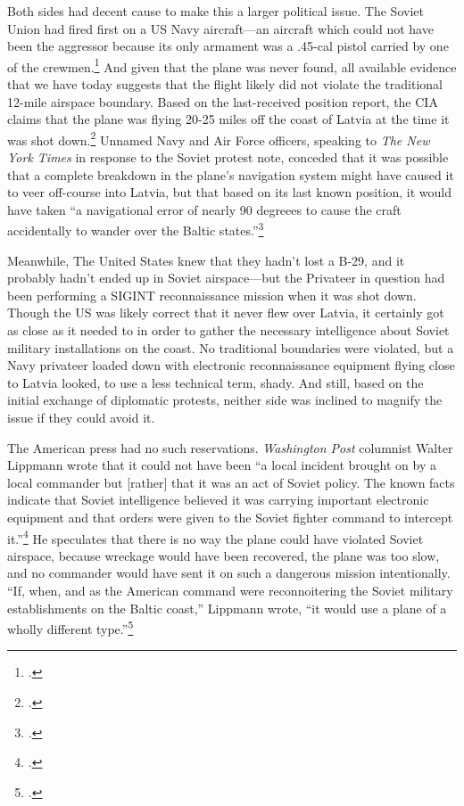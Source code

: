 \documentclass[12pt]{article}
\begin{document}
Both sides had decent cause to make this a larger political issue. The Soviet Union had fired first on a US Navy aircraft---an aircraft which could not have been the aggressor because its only armament was a .45-cal pistol carried by one of the crewmen.\footcite[p.~7]{peterson_maybe_1993} And given that the plane was never found, all available evidence that we have today suggests that the flight likely did not violate the traditional 12-mile airspace boundary. Based on the last-received position report, the CIA claims that the plane was flying 20-25 miles off the coast of Latvia at the time it was shot down.\footcite[p.~7]{peterson_maybe_1993} Unnamed Navy and Air Force officers, speaking to \emph{The New York Times} in response to the Soviet protest note, conceded that it was possible that a complete breakdown in the plane's navigation system might have caused it to veer off-course into Latvia, but that based on its last known position, it would have taken ``a navigational error of nearly 90 degreees to cause the craft accidentally to wander over the Baltic states.''\footcite[Technically, the  article credits the first statement about the possible electronic breakdown to ``Navy and Air Force officials'' and the 90 degrees statement to ``Aerial navigators.'' It is unclear whether the navigators in questions are with the US military, but it does not matter regardless.]{the_new_york_times_soviet_1950}

Meanwhile, The United States knew that they hadn't lost a B-29, and it probably hadn't ended up in Soviet airspace---but the Privateer in question had been performing a SIGINT reconnaissance mission when it was shot down. Though the US was likely correct that it never flew over Latvia, it certainly got as close as it needed to in order to gather the necessary intelligence about Soviet military installations on the coast. No traditional boundaries were violated, but a Navy privateer loaded down with electronic reconnaissance equipment flying close to Latvia looked, to use a less technical term, shady. And still, based on the initial exchange of diplomatic protests, neither side was inclined to magnify the issue if they could avoid it.

The American press had no such reservations. \emph{Washington Post} columnist Walter Lippmann wrote that it could not have been ``a local incident brought on by a local commander but [rather] that it was an act of Soviet policy. The known facts indicate that Soviet intelligence \textelp{} believed it was carrying important electronic equipment and that orders were given to the Soviet fighter command to intercept it.''\footcite{lippmann_baltic_1950} He speculates that there is no way the plane could have violated Soviet airspace, because wreckage would have been recovered, the plane was too slow, and no commander would have sent it on such a dangerous mission intentionally. ``If, when, and as the American command were reconnoitering the Soviet military establishments on the Baltic coast,'' Lippmann wrote, ``it would use a plane of a wholly different type.''\footcite{lippmann_baltic_1950}
\end{document}
